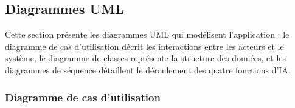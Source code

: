 \subsection{Diagrammes UML}

Cette section présente les diagrammes UML qui modélisent l'application : le diagramme de
cas d'utilisation décrit les interactions entre les acteurs et le système, le diagramme de
classes représente la structure des données, et les diagrammes de séquence détaillent le
déroulement des quatre fonctions d'IA.

\subsubsection{Diagramme de cas d'utilisation}


